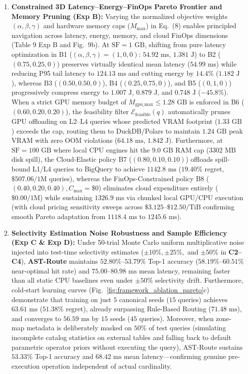 \documentclass[10pt,a4paper]{article}
\begin{document}
\begin{enumerate}[leftmargin=1.5em,itemsep=2pt]
    \item \textbf{Constrained 3D Latency--Energy--FinOps Pareto Frontier and Memory Pruning (Exp B):} Varying the normalized objective weights $(\alpha, \beta, \gamma)$ and hardware memory caps ($M_{\max}$) in Eq.~(8) enables principled navigation across latency, energy, memory, and cloud FinOps dimensions (Table 9 Exp B and Fig.~9b). At $\text{SF}=1\text{ GB}$, shifting from pure latency optimization in B1 ($(\alpha,\beta,\gamma)=(1,0,0)$: $54.92\text{ ms}$, $1.381\text{ J}$) to B2 ($(0.75, 0.25, 0)$) preserves virtually identical mean latency ($54.99\text{ ms}$) while reducing P95 tail latency to $124.13\text{ ms}$ and cutting energy by $14.4\%$ ($1.182\text{ J}$), whereas B3 ($(0.50, 0.50, 0)$), B4 ($(0.25, 0.75, 0)$), and B5 ($(0, 1, 0)$) progressively compress energy to $1.007\text{ J}$, $0.879\text{ J}$, and $0.748\text{ J}$ ($-45.8\%$). When a strict GPU memory budget of $M_{\text{gpu\_max}} \le 1.28\text{ GB}$ is enforced in B6 ($(0.60, 0.20, 0.20)$), the feasibility filter $\mathcal{E}_{\text{feasible}}(q)$ automatically prunes GPU offloading on L2--L4 queries whose predicted VRAM footprint ($1.33\text{ GB}$) exceeds the cap, routing them to DuckDB/Polars to maintain $1.24\text{ GB}$ peak VRAM with zero OOM violations ($64.18\text{ ms}$, $1.842\text{ J}$). Furthermore, at $\text{SF}=100\text{ GB}$ where local CPU engines hit the $9.0\text{ GB}$ RAM cap ($3302\text{ MB}$ disk spill), the Cloud-Elastic policy B7 ($(0.80, 0.10, 0.10)$) offloads spill-bound L1/L4 queries to BigQuery to achieve $1142.8\text{ ms}$ ($19.40\%$ regret, $\$507.06/1\text{M}$ queries), whereas the FinOps-Constrained policy B8 ($(0.40, 0.20, 0.40), C_{\max}=\$0$) eliminates cloud expenditure entirely ($\$0.00/1\text{M}$) while sustaining $1326.9\text{ ms}$ via chunked local GPU/CPU execution (with cloud pricing sensitivity sweeps across $\$3.125\text{--}\$12.50\text{/TiB}$ confirming smooth Pareto adaptation from $1118.4\text{ ms}$ to $1245.6\text{ ms}$). 
    \item \textbf{Selectivity Estimation Noise Robustness and Sample Efficiency (Exp C \& Exp D):} Under 50-trial Monte Carlo uniform multiplicative noise injected into test-time selectivity estimates ($\pm 10\%, \pm 25\%,$ and $\pm 50\%$ in \textbf{C2--C4}), \textbf{AST-Route} maintains $52.80\%\text{--}53.79\%$ Top-1 accuracy ($58.19\%\text{--}60.51\%$ near-optimal hit rate) and $75.00\text{--}80.98\text{ ms}$ mean latency, remaining faster than all static CPU baselines even under $\pm 50\%$ selectivity drift. Furthermore, cold-start learning curves (Fig.~\ref{fig:framework_ablation_pareto}c) demonstrate that training on just $5$ canonical seeds ($15$ queries) achieves $63.61\text{ ms}$ ($51.38\%$ regret), already surpassing Rule-Based Routing ($71.48\text{ ms}$), and converges to $56.59\text{ ms}$ by $15$ seeds ($45$ queries). Moreover, when zone-map metadata is deliberately masked on $50\%$ of test queries (simulating incomplete catalog statistics on external tables and falling back to default parametric operator priors without executing the query), AST-Route sustains $53.33\%$ Top-1 accuracy and $68.42\text{ ms}$ mean latency---confirming genuine pre-execution operation independent of actual cardinality.

\end{enumerate}
\end{document}

